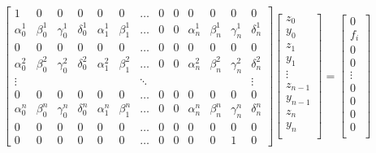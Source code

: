 \documentclass{article}
\begin{document}
\begin{equation*}
    \begin{bmatrix}
        1 & 0 & 0 & 0 & 0 & 0 & \hdots & 0 & 0 & 0 & 0 & 0 & 0 \\
        \alpha^1_0 & \beta^1_0 & \gamma^1_0 & \delta^1_0 & \alpha^1_1 & \beta^1_1 & \hdots & 0 & 0 & \alpha^1_n & \beta^1_n & \gamma^1_n & \delta^1_n \\
        0 & 0 & 0 & 0 & 0 & 0 & \hdots & 0 & 0 & 0 & 0 & 0 & 0 \\
        \alpha^2_0 & \beta^2_0 & \gamma^2_0 & \delta^2_0 & \alpha^2_1 & \beta^2_1 & \hdots & 0 & 0 & \alpha^2_n & \beta^2_n & \gamma^2_n & \delta^2_n \\        
        \vdots & & & & & & \ddots & & & & & & \vdots \\
        0 & 0 & 0 & 0 & 0 & 0 & \hdots & 0 & 0 & 0 & 0 & 0 & 0 \\
        \alpha^n_0 & \beta^n_0 & \gamma^n_0 & \delta^n_0 & \alpha^n_1 & \beta^n_1 & \hdots & 0 & 0 & \alpha^n_n & \beta^n_n & \gamma^n_n & \delta^n_n \\
        0 & 0 & 0 & 0 & 0 & 0 & \hdots & 0 & 0 & 0 & 0 & 0 & 0 \\
        0 & 0 & 0 & 0 & 0 & 0 & \hdots & 0 & 0 & 0 & 0 & 1 & 0 
    \end{bmatrix}
    \begin{bmatrix}
        z_0 \\
        y_0 \\
        z_1 \\
        y_1 \\
        \vdots \\
        z_{n-1} \\
        y_{n-1} \\
        z_n \\
        y_n \\
    \end{bmatrix} =
    \begin{bmatrix}
        0 \\
        f_i \\
        0 \\
        0 \\
        \vdots \\
        0 \\
        0 \\
        0 \\
        0 \\
    \end{bmatrix}
\end{equation*}
\end{document}
